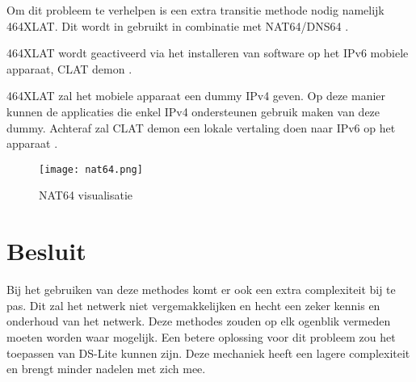 Om dit probleem te verhelpen is een extra transitie methode nodig namelijk 464XLAT. Dit wordt in gebruikt in combinatie met NAT64/DNS64 \autocite{RIPE2016}.

464XLAT wordt geactiveerd via het installeren van software op het IPv6 mobiele apparaat, CLAT demon \autocite{RIPE2016}.

464XLAT zal het mobiele apparaat een dummy IPv4 geven. Op deze manier kunnen de applicaties die enkel IPv4 ondersteunen gebruik maken van deze dummy. Achteraf zal CLAT demon een lokale vertaling doen naar IPv6 op het apparaat \autocite{RIPE2016}.

\begin{figure}
\centering
\texttt{[image: nat64.png]}
\caption{NAT64 visualisatie \autocite{RIPE2016}}
\end{figure}

\section{Besluit}

Bij het gebruiken van deze methodes komt er ook een extra complexiteit bij te pas. Dit zal het netwerk niet vergemakkelijken en hecht een zeker kennis en onderhoud van het netwerk. Deze methodes zouden op elk ogenblik vermeden moeten worden waar mogelijk. Een betere oplossing voor dit probleem zou het toepassen van DS-Lite kunnen zijn. Deze mechaniek heeft een lagere complexiteit en brengt minder nadelen met zich mee.